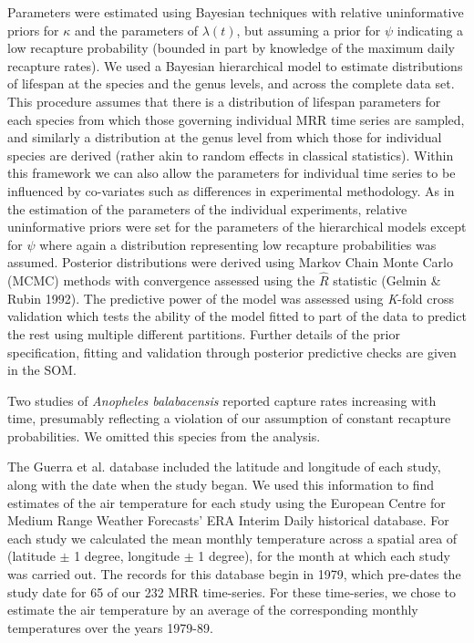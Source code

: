 \documentclass[]{article}
\begin{document}
Parameters were estimated using Bayesian techniques with relative
uninformative priors for $\kappa$ and the parameters of
$\lambda(t)$, but assuming a prior for $\psi$ indicating a low
recapture probability (bounded in part by knowledge of the maximum daily
recapture rates). We used a Bayesian hierarchical model to estimate
distributions of lifespan at the species and the genus levels, and
across the complete data set. This procedure assumes that there is a
distribution of lifespan parameters for each species from which those
governing individual MRR time series are sampled, and similarly a
distribution at the genus level from which those for individual species
are derived (rather akin to random effects in classical statistics).
Within this framework we can also allow the parameters for individual
time series to be influenced by co-variates such as differences in
experimental methodology. As in the estimation of the parameters of the
individual experiments, relative uninformative priors were set for the
parameters of the hierarchical models except for $\psi$ where again a
distribution representing low recapture probabilities was assumed.
Posterior distributions were derived using Markov Chain Monte Carlo
(MCMC) methods with convergence assessed using the \(\hat{R}\) statistic
(Gelmin \& Rubin 1992). The predictive power of the model was assessed
using \emph{K}-fold cross validation which tests the ability of the
model fitted to part of the data to predict the rest using multiple
different partitions. Further details of the prior specification,
fitting and validation through posterior predictive checks are given in
the SOM.

Two studies of \emph{Anopheles balabacensis} reported capture rates
increasing with time, presumably reflecting a violation of our
assumption of constant recapture probabilities. We omitted this species
from the analysis.

The Guerra et al. database included the latitude and longitude of each
study, along with the date when the study began. We used this information to find
estimates of the air temperature for each study using the European Centre for Medium
Range Weather Forecasts' ERA Interim Daily historical database. For each
study we calculated the mean monthly temperature across a spatial area
of (latitude $\pm$ 1 degree, longitude $\pm$ 1 degree), for the month at which
each study was carried out. The records for this database begin in 1979,
which pre-dates the study date for 65 of our 232 MRR time-series. For
these time-series, we chose to estimate the air temperature by an
average of the corresponding monthly temperatures over the years
1979-89.
\end{document}

